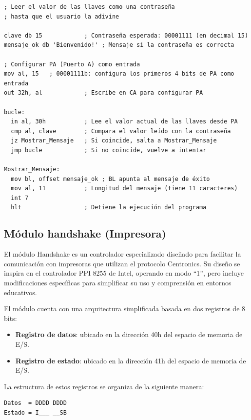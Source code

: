 \documentclass[12pt,oneside]{templates/unerthesis}
\providecommand{\tightlist}{%
  \setlength{\itemsep}{0pt}\setlength{\parskip}{0pt}}
\begin{document}
\begin{lstlisting}
; Leer el valor de las llaves como una contraseña 
; hasta que el usuario la adivine

clave db 15            ; Contraseña esperada: 00001111 (en decimal 15)
mensaje_ok db 'Bienvenido!' ; Mensaje si la contraseña es correcta

; Configurar PA (Puerto A) como entrada
mov al, 15   ; 00001111b: configura los primeros 4 bits de PA como entrada
out 32h, al            ; Escribe en CA para configurar PA

bucle:
  in al, 30h           ; Lee el valor actual de las llaves desde PA
  cmp al, clave        ; Compara el valor leído con la contraseña
  jz Mostrar_Mensaje   ; Si coincide, salta a Mostrar_Mensaje
  jmp bucle            ; Si no coincide, vuelve a intentar

Mostrar_Mensaje:
  mov bl, offset mensaje_ok ; BL apunta al mensaje de éxito
  mov al, 11           ; Longitud del mensaje (tiene 11 caracteres)
  int 7
  hlt                  ; Detiene la ejecución del programa\end{lstlisting}

\hypertarget{muxf3dulo-handshake-impresora}{%
\subsection{Módulo handshake (Impresora)}\label{muxf3dulo-handshake-impresora}}

El módulo Handshake es un controlador especializado diseñado para facilitar la comunicación con impresoras que utilizan el protocolo Centronics. Su diseño se inspira en el controlador PPI 8255 de Intel, operando en modo ``1'', pero incluye modificaciones específicas para simplificar su uso y comprensión en entornos educativos.

El módulo cuenta con una arquitectura simplificada basada en dos registros de 8 bits:

\begin{itemize}
\tightlist
\item
  \textbf{Registro de datos}: ubicado en la dirección 40h del espacio de memoria de E/S.
\item
  \textbf{Registro de estado}: ubicado en la dirección 41h del espacio de memoria de E/S.
\end{itemize}

La estructura de estos registros se organiza de la siguiente manera:

\begin{verbatim}
Datos  = DDDD DDDD
Estado = I___ __SB
\end{verbatim}
\end{document}
